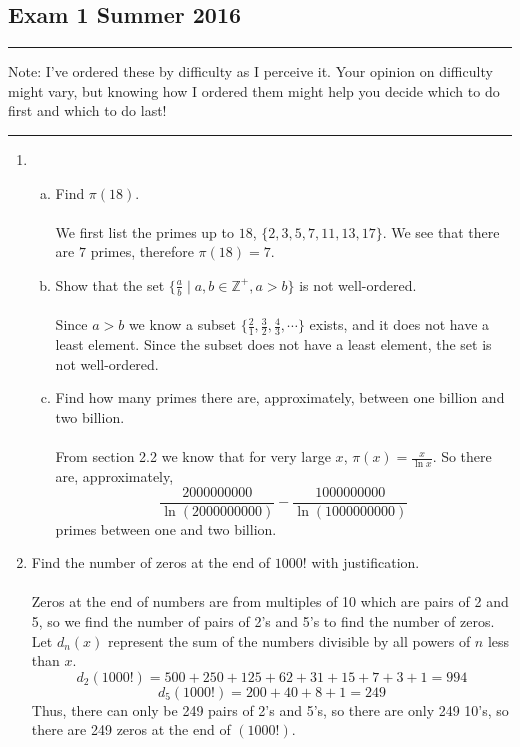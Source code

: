 \documentclass[class=article, crop=false]{standalone}
\def\integers{{\mathbb Z}}
\begin{document}
\subsection{Exam 1 Summer 2016}
\rule{\textwidth}{1pt}
Note: I've ordered these by difficulty as I perceive it. Your opinion on difficulty might vary,
but knowing how I ordered them might help you decide which to do first and which to do last!\\
\rule{\textwidth}{1pt}
\begin{enumerate}[1.]
	\item 
	\begin{enumerate}[(a)]
		\item Find $\pi(18)$.\\\\
		We first list the primes up to $18$, $\{2,3,5,7,11,13,17\}$. We see that there are $7$ primes,
		therefore $\pi(18)=7$.
		
		\item Show that the set $\{\frac{a}{b} \mid a,b\in\integers^+, a>b\}$ is not well-ordered.\\\\
		Since $a>b$ we know a subset 
		$\{\frac{2}{1}, \frac{3}{2}, \frac{4}{3},\cdots\}$ exists, and it does not have a least element.
		Since the subset does not have a least element, the set is not well-ordered.
		
		\item Find how many primes there are, approximately, between one billion and two billion.\\\\
		From section 2.2 we know that for very large $x$, $\pi(x)=\frac{x}{\ln x}$.
		So there are, approximately, 
		$$\frac{2000000000}{\ln(2000000000)} - \frac{1000000000}{\ln(1000000000)}$$
		primes between one and two billion.
	
	\end{enumerate}

	
	\item Find the number of zeros at the end of $1000!$ with justification.\\\\
	Zeros at the end of numbers are from multiples of 10 which are pairs of 2 and 5, so
  	we find the number of pairs of 2's and 5's to find the number of zeros. Let $d_n(x)$
  	represent the sum of the numbers divisible by all powers of $n$ less than $x$. 
  	$$d_2(1000!) = 500 + 250 + 125 + 62 + 31 + 15 + 7 + 3 + 1 = 994$$
  	$$d_5(1000!) = 200 + 40 + 8 + 1 = 249$$
  	Thus, there can only be 249 pairs of 2's and 5's, so there are only 249 
  	10's, so there are 249 zeros at the end of $(1000!)$.
	

\end{enumerate}
\end{document}

